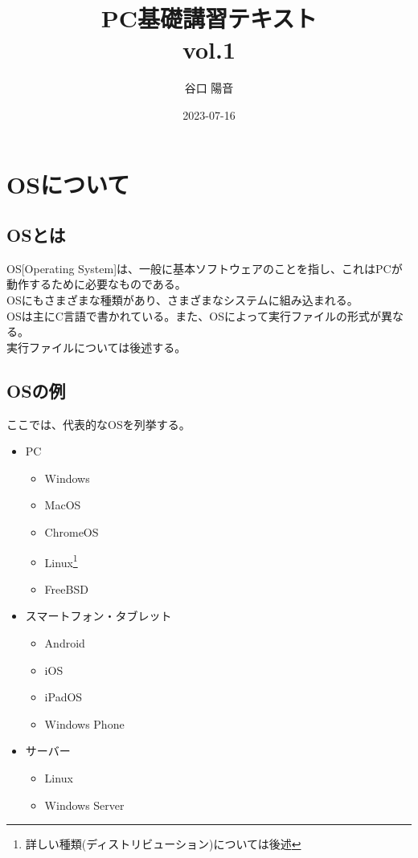 \documentclass{ltjsarticle}
\begin{document}
\title{PC基礎講習テキスト\\vol.1}
\author{谷口 陽音}
\date{2023-07-16}
\maketitle
\section{OSについて}
\subsection{OSとは}
OS[Operating System]は、一般に基本ソフトウェアのことを指し、これはPCが動作するために必要なものである。\\
OSにもさまざまな種類があり、さまざまなシステムに組み込まれる。\\
OSは主にC言語で書かれている。また、OSによって実行ファイルの形式が異なる。\\
実行ファイルについては後述する。
\subsection{OSの例}
ここでは、代表的なOSを列挙する。
\begin{itemize}
    \item PC
    \begin{itemize}
        \item Windows
        \item MacOS
        \item ChromeOS
        \item Linux\footnote[1]{詳しい種類(ディストリビューション)については後述}
        \item FreeBSD
    \end{itemize}
    \item スマートフォン・タブレット
    \begin{itemize}
        \item Android
        \item iOS
        \item iPadOS
        \item Windows Phone
    \end{itemize}
    \item サーバー
    \begin{itemize}
        \item Linux
        \item Windows Server
    \end{itemize}
\end{itemize}
\end{document}

